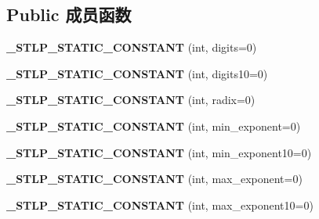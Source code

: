 \subsection*{Public 成员函数}
\begin{DoxyCompactItemize}
\item 
\mbox{\label{class___numeric__limits__base_a7c35461bc3ba52a7c842876eeedb35a0}} 
{\bfseries \+\_\+\+S\+T\+L\+P\+\_\+\+S\+T\+A\+T\+I\+C\+\_\+\+C\+O\+N\+S\+T\+A\+NT} (int, digits=0)
\item 
\mbox{\label{class___numeric__limits__base_a1dc61d1840125087c445b8dca5b64aba}} 
{\bfseries \+\_\+\+S\+T\+L\+P\+\_\+\+S\+T\+A\+T\+I\+C\+\_\+\+C\+O\+N\+S\+T\+A\+NT} (int, digits10=0)
\item 
\mbox{\label{class___numeric__limits__base_abd44d3b7de673581f0db5f9eb11fbbd6}} 
{\bfseries \+\_\+\+S\+T\+L\+P\+\_\+\+S\+T\+A\+T\+I\+C\+\_\+\+C\+O\+N\+S\+T\+A\+NT} (int, radix=0)
\item 
\mbox{\label{class___numeric__limits__base_a4dc63f747a750e8e85cabf29dd0b28aa}} 
{\bfseries \+\_\+\+S\+T\+L\+P\+\_\+\+S\+T\+A\+T\+I\+C\+\_\+\+C\+O\+N\+S\+T\+A\+NT} (int, min\+\_\+exponent=0)
\item 
\mbox{\label{class___numeric__limits__base_a149efe0e95c9060ec2119dc758e20389}} 
{\bfseries \+\_\+\+S\+T\+L\+P\+\_\+\+S\+T\+A\+T\+I\+C\+\_\+\+C\+O\+N\+S\+T\+A\+NT} (int, min\+\_\+exponent10=0)
\item 
\mbox{\label{class___numeric__limits__base_ae16ff9f91e4c94e6b1f16e7aeab13115}} 
{\bfseries \+\_\+\+S\+T\+L\+P\+\_\+\+S\+T\+A\+T\+I\+C\+\_\+\+C\+O\+N\+S\+T\+A\+NT} (int, max\+\_\+exponent=0)
\item 
\mbox{\label{class___numeric__limits__base_a8f54166a8e88c12a1e50a206b1edc8c9}} 
{\bfseries \+\_\+\+S\+T\+L\+P\+\_\+\+S\+T\+A\+T\+I\+C\+\_\+\+C\+O\+N\+S\+T\+A\+NT} (int, max\+\_\+exponent10=0)
\item 
\mbox{\label{class___numeric__limits__base_a87765fecf0256eee62c5261890f3bbbf}} 

\end{DoxyCompactItemize}
